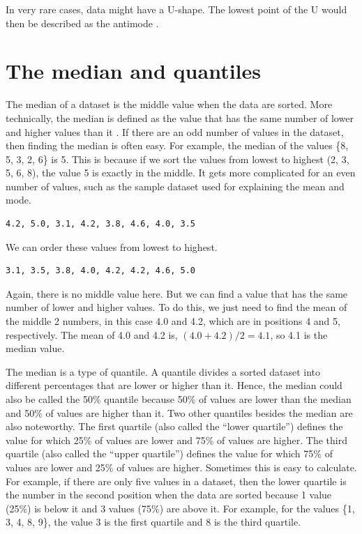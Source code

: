 \documentclass[
  openany]{scrbook}
\begin{document}
In very rare cases, data might have a U-shape.
The lowest point of the U would then be described as the antimode \citep{Sokal1995}.

\hypertarget{the-median-and-quantiles}{%
\section{The median and quantiles}\label{the-median-and-quantiles}}

The median of a dataset is the middle value when the data are sorted.
More technically, the median is defined as the value that has the same number of lower and higher values than it \citep{Sokal1995}.
If there are an odd number of values in the dataset, then finding the median is often easy.
For example, the median of the values \{8, 5, 3, 2, 6\} is 5.
This is because if we sort the values from lowest to highest (2, 3, 5, 6, 8), the value 5 is exactly in the middle.
It gets more complicated for an even number of values, such as the sample dataset used for explaining the mean and mode.

\begin{verbatim}
4.2, 5.0, 3.1, 4.2, 3.8, 4.6, 4.0, 3.5
\end{verbatim}

We can order these values from lowest to highest.

\begin{verbatim}
3.1, 3.5, 3.8, 4.0, 4.2, 4.2, 4.6, 5.0
\end{verbatim}

Again, there is no middle value here.
But we can find a value that has the same number of lower and higher values.
To do this, we just need to find the mean of the middle 2 numbers, in this case 4.0 and 4.2, which are in positions 4 and 5, respectively.
The mean of 4.0 and 4.2 is, \((4.0 + 4.2)/2 = 4.1\), so 4.1 is the median value.

The median is a type of quantile.
A quantile divides a sorted dataset into different percentages that are lower or higher than it.
Hence, the median could also be called the 50\% quantile because 50\% of values are lower than the median and 50\% of values are higher than it.
Two other quantiles besides the median are also noteworthy.
The first quartile (also called the ``lower quartile'') defines the value for which 25\% of values are lower and 75\% of values are higher.
The third quartile (also called the ``upper quartile'') defines the value for which 75\% of values are lower and 25\% of values are higher.
Sometimes this is easy to calculate.
For example, if there are only five values in a dataset, then the lower quartile is the number in the second position when the data are sorted because 1 value (25\%) is below it and 3 values (75\%) are above it.
For example, for the values \{1, 3, 4, 8, 9\}, the value 3 is the first quartile and 8 is the third quartile.
\end{document}
